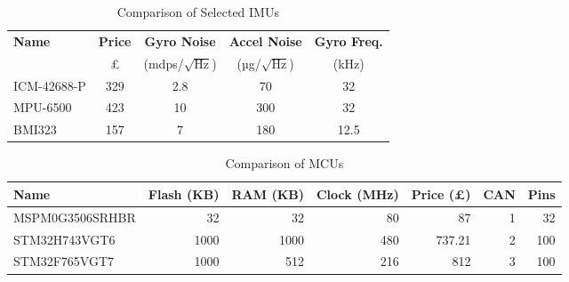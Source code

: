 \begin{table}[htbp]
  \centering
  \begin{tabular}{|l|c|c|c|c|}
    \hline
    \textbf{Name} & \textbf{Price} & \textbf{Gyro Noise} & \textbf{Accel Noise} & \textbf{Gyro Freq.} \\
    & £ & (mdps/$\sqrt{\text{Hz}}$) & (µg/$\sqrt{\text{Hz}}$) & (kHz) \\
    \hline
    ICM-42688-P\tablefootnote{\url{https://invensense.tdk.com/products/motion-tracking/6-axis/icm-42688-p/}} & 329 & 2.8 & 70 & 32 \\
    MPU-6500\tablefootnote{\url{https://invensense.tdk.com/products/motion-tracking/6-axis/mpu-6500/}}    & 423 & 10  & 300 & 32 \\
    BMI323\tablefootnote{\url{https://www.bosch-sensortec.com/products/motion-sensors/imus/bmi323}}      & 157 & 7   & 180 & 12.5 \\
    \hline
  \end{tabular}
  \caption{Comparison of Selected IMUs}
  \label{tab:imu-comparison}
\end{table}

\begin{table}[htbp]
  \centering
  \begin{tabular}{|l|r|r|r|r|r|r|}
    \hline
    \textbf{Name} & \textbf{Flash (KB)} & \textbf{RAM (KB)} & \textbf{Clock (MHz)} & \textbf{Price (£)} & \textbf{CAN} & \textbf{Pins} \\
    \hline
    MSPM0G3506SRHBR\tablefootnote{\url{https://www.ti.com/product/MSPM0G3506/part-details/MSPM0G3506SRHBR}} & 32 & 32 & 80 & 87 & 1 & 32 \\
    STM32H743VGT6\tablefootnote{\url{https://www.st.com/en/microcontrollers-microprocessors/stm32h743vg.html}} & 1000 & 1000 & 480 & 737.21 & 2 & 100 \\
    STM32F765VGT7\tablefootnote{\url{https://www.st.com/en/microcontrollers-microprocessors/stm32f765vg.html}} & 1000 & 512 & 216 & 812 & 3 & 100 \\
    \hline
  \end{tabular}
  \caption{Comparison of MCUs}
  \label{tab:mcu-comparison}
\end{table}

